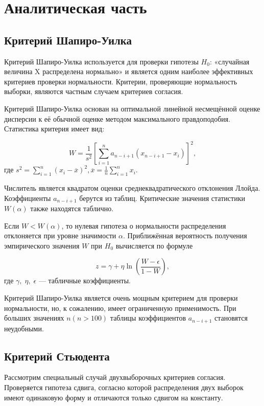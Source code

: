\chapter{Аналитическая часть}



\section{Критерий Шапиро-Уилка}
Критерий Шапиро-Уилка используется для проверки гипотезы $H_0$: «случайная величина X распределена нормально» и является одним наиболее эффективных критериев проверки нормальности. Критерии, проверяющие нормальность выборки, являются частным случаем критериев согласия.

Критерий Шапиро-Уилка основан на оптимальной линейной несмещённой оценке дисперсии к её обычной оценке методом максимального правдоподобия. Статистика критерия имеет вид:

\begin{equation}
	W=\frac{1}{s^2}\left[\sum_{i=1}^n a_{n-i+1} (x_{n-i+1} -x_i)\right]^2,
\end{equation}
где $s^2=\sum_{i=1}^n (x_i -\overline{x})^2, \overline{x}=\frac{1}{n}\sum_{i=1}^n x_i$.

Числитель является квадратом оценки среднеквадратического отклонения Ллойда. Коэффициенты $a_{n-i+1}$ берутся из таблиц. Критические значения статистики $W(\alpha)$ также находятся таблично.

Если $W<W(\alpha)$, то нулевая гипотеза о нормальности распределения отклоняется при уровне значимости $\alpha$. Приближённая вероятность получения эмпирического значения $W$ при $H_0$ вычисляется по формуле

\begin{equation}
	z=\gamma+\eta \ln \left(\frac{W-\epsilon}{1-W}\right),
\end{equation}
где $\gamma,\; \eta,\; \epsilon$ — табличные коэффициенты.

Критерий Шапиро-Уилка является очень мощным критерием для проверки нормальности, но, к сожалению, имеет ограниченную применимость. При больших значениях $n (n>100)$ таблицы коэффициентов $a_{n-i+1}$ становятся неудобными.


\section{Критерий Стьюдента}

Рассмотрим специальный случай двухвыборочных критериев согласия. Проверяется
гипотеза сдвига, согласно которой распределения двух выборок имеют
одинаковую форму и отличаются только сдвигом на константу.

